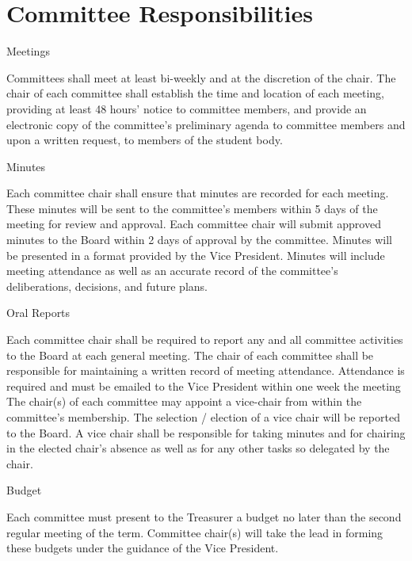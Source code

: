 \section{Committee Responsibilities}
\begin{enumsubsection}
\item{Meetings}
\begin{enumsubsubsection}
\itemnotoc Committees shall meet at least bi-weekly and at the discretion of 
the chair. 
\itemnotoc The chair of each committee shall establish the time and 
location of each meeting, providing at least 48 hours' notice to 
committee members, and provide an electronic copy of the 
committee's preliminary agenda to committee members and 
upon a written request, to members of the student body. 
\end{enumsubsubsection}
\item{Minutes}
\begin{enumsubsubsection}
\itemnotoc Each committee chair shall ensure that minutes are 
recorded for each meeting. These minutes will be sent to 
the committee's members within 5 days of the meeting 
for review and approval. 
\itemnotoc Each committee chair will submit approved minutes to 
the Board within 2 days of approval by the committee.
\itemnotoc Minutes will be presented in a format provided by the 
Vice President.
\itemnotoc Minutes will include meeting attendance as well as an 
accurate record of the committee's deliberations, 
decisions, and future plans.
\end{enumsubsubsection}
\item{Oral Reports}
\begin{enumsubsubsection}
\itemnotoc Each committee chair shall be required to report any and all 
committee activities to the Board at each general meeting. 
\itemnotoc The chair of each committee shall be responsible for maintaining 
a written record of meeting attendance. Attendance is required 
and must be emailed to the Vice President within one week the 
meeting 
\itemnotoc The chair(s) of each committee may appoint a vice-chair from 
within the committee's membership. The selection / election of a 
vice chair will be reported to the Board. A vice chair shall be 
responsible for taking minutes and for chairing in the elected 
chair's absence as well as for any other tasks so delegated by the 
chair. 
\end{enumsubsubsection}
\item{Budget}
\begin{enumsubsubsection}
\itemnotoc Each committee must present to the Treasurer a budget no later 
than the second regular meeting of the term. Committee chair(s) 
will take the lead in forming these budgets under the guidance of 
the Vice President.
\end{enumsubsubsection}
\end{enumsubsection}
